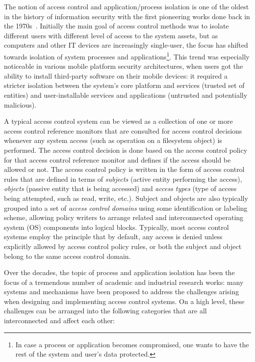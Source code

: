 
The notion of access control and application/process isolation is one of the oldest in the history of information security with the first pioneering works done back in the 1970s~\cite{saltzer75, Denning76}. Initially the main goal of access control methods was to isolate different users with different level of access to the system assets, but as computers and other IT devices are increasingly single-user, the focus has shifted towards isolation of system processes and applications\footnote{In case a process or application becomes compromised, one wants to have the rest of the system and user's data protected.}.
 This trend was especially noticeable in various mobile platform security architectures, when users got the ability to install third-party software on their mobile devices: it required a stricter isolation between the system's core platform and services (trusted set of entities) and user-installable services and applications (untrusted and potentially malicious).

A typical access control system can be viewed as a collection of one or more access control reference monitors that are consulted for access control decisions whenever any system access (such as operation on a filesystem object) is performed. The access control decision is done based on the access control policy for that access control reference monitor and defines if the access should be allowed or not. The access control policy is written in the form of access control rules that are defined in terms of \textit{subjects} (active entity performing the access), \textit{objects} (passive entity that is being accessed) and \textit{access types} (type of access being attempted, such as read, write, etc.). Subject and objects are also typically grouped into a set of \textit{access control domains} using some identification or labeling scheme, allowing policy writers to arrange related and interconnected operating system (OS) components into logical blocks. Typically, most access control systems employ the principle that by default, any access is denied unless explicitly allowed by access control policy rules, or both the subject and object belong to the same access control domain.
 
Over the decades, the topic of process and application isolation has been the focus of a tremendous number of academic and industrial research works: many systems and mechanisms have been proposed to address the challenges arising when designing and implementing access control systems. On a high level, these challenges can be arranged into the following categories that are all interconnected and affect each other: 

